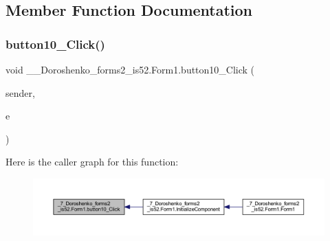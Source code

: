\subsection{Member Function Documentation}
\hypertarget{class__7___doroshenko__forms2__is52_1_1_form1_acb4571cf35bccb4d8524ed4efd9d6f69}{}\label{class__7___doroshenko__forms2__is52_1_1_form1_acb4571cf35bccb4d8524ed4efd9d6f69} 
\subsubsection{\texorpdfstring{button10\+\_\+\+Click()}{button10\_Click()}}
{\footnotesize\ttfamily void \+\_\+\_\+\+Doroshenko\+\_\+forms2\+\_\+is52.\+Form1.\+button10\+\_\+\+Click (\begin{DoxyParamCaption}\item[{object}]{sender,  }\item[{Event\+Args}]{e }\end{DoxyParamCaption})\hspace{0.3cm}{\ttfamily [private]}}

Here is the caller graph for this function\+:
\nopagebreak
\begin{figure}[H]
\begin{center}
\leavevmode
\includegraphics[width=350pt]{class__7___doroshenko__forms2__is52_1_1_form1_acb4571cf35bccb4d8524ed4efd9d6f69_icgraph}
\end{center}
\end{figure}
\hypertarget{class__7___doroshenko__forms2__is52_1_1_form1_a607baff215aa451ab201b1afe65c9669}{}\label{class__7___doroshenko__forms2__is52_1_1_form1_a607baff215aa451ab201b1afe65c9669} 

